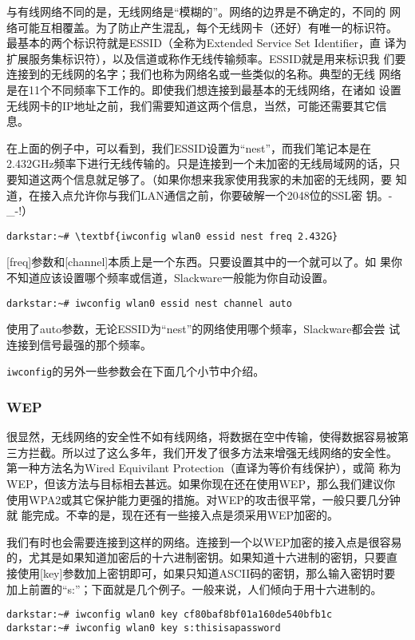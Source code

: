 与有线网络不同的是，无线网络是``模糊的''。网络的边界是不确定的，不同的
网络可能互相覆盖。为了防止产生混乱，每个无线网卡（还好）有唯一的标识符。
最基本的两个标识符就是ESSID（全称为Extended Service Set Identifier，直
译为扩展服务集标识符），以及信道或称作无线传输频率。ESSID就是用来标识我
们要连接到的无线网的名字；我们也称为网络名或一些类似的名称。典型的无线
网络是在11个不同频率下工作的。即使我们想连接到最基本的无线网络，在诸如
设置无线网卡的IP地址之前，我们需要知道这两个信息，当然，可能还需要其它信
息。

在上面的例子中，可以看到，我们ESSID设置为``nest''，而我们笔记本是在
2.432GHz频率下进行无线传输的。只是连接到一个未加密的无线局域网的话，只
要知道这两个信息就足够了。（如果你想来我家使用我家的未加密的无线网，要
知道，在接入点允许你与我们LAN通信之前，你要破解一个2048位的SSL密
钥。-\_-!）
\begin{Verbatim}[frame=single,commandchars=\\\{\}]
darkstar:~# \textbf{iwconfig wlan0 essid nest freq 2.432G}
\end{Verbatim}
[freq]参数和[channel]本质上是一个东西。只要设置其中的一个就可以了。如
果你不知道应该设置哪个频率或信道，Slackware一般能为你自动设置。
\begin{Verbatim}[frame=single,commandchars=\\\{\}]
darkstar:~# iwconfig wlan0 essid nest channel auto 
\end{Verbatim}

使用了auto参数，无论ESSID为``nest''的网络使用哪个频率，Slackware都会尝
试连接到信号最强的那个频率。

\texttt{iwconfig}的另外一些参数会在下面几个小节中介绍。

\subsubsection{WEP}
\label{sec:networkConfiguration:wireless:details:wep}
很显然，无线网络的安全性不如有线网络，将数据在空中传输，使得数据容易被第
三方拦截。所以过了这么多年，我们开发了很多方法来增强无线网络的安全性。
第一种方法名为Wired Equivilant Protection（直译为等价有线保护），或简
称为WEP，但该方法与目标相去甚远。如果你现在还在使用WEP，那么我们建议你
使用WPA2或其它保护能力更强的措施。对WEP的攻击很平常，一般只要几分钟就
能完成。不幸的是，现在还有一些接入点是须采用WEP加密的。

我们有时也会需要连接到这样的网络。连接到一个以WEP加密的接入点是很容易
的，尤其是如果知道加密后的十六进制密钥。如果知道十六进制的密钥，只要直
接使用[key]参数加上密钥即可，如果只知道ASCII码的密钥，那么输入密钥时要
加上前置的``s:''；下面就是几个例子。一般来说，人们倾向于用十六进制的。
\begin{Verbatim}[frame=single,commandchars=\\\{\}]
darkstar:~# iwconfig wlan0 key cf80baf8bf01a160de540bfb1c
darkstar:~# iwconfig wlan0 key s:thisisapassword
\end{Verbatim}

